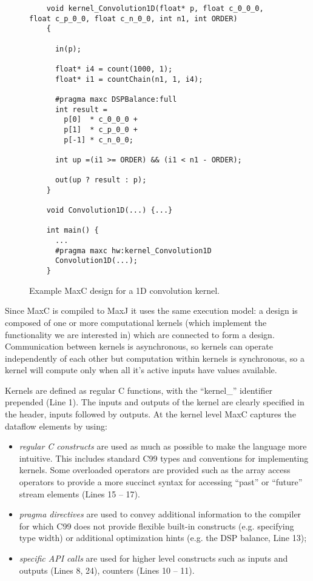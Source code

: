 \begin{figure}[!h]
  \begin{lstlisting}
    void kernel_Convolution1D(float* p, float c_0_0_0, float c_p_0_0, float c_n_0_0, int n1, int ORDER)
    {

      in(p);

      float* i4 = count(1000, 1);
      float* i1 = countChain(n1, 1, i4);

      #pragma maxc DSPBalance:full
      int result =
        p[0]  * c_0_0_0 +
        p[1]  * c_p_0_0 +
        p[-1] * c_n_0_0;

      int up =(i1 >= ORDER) && (i1 < n1 - ORDER);

      out(up ? result : p);
    }

    void Convolution1D(...) {...}

    int main() {
      ...
      #pragma maxc hw:kernel_Convolution1D
      Convolution1D(...);
    }
  \end{lstlisting}
  \caption{Example MaxC design for a 1D convolution kernel.}
  \label{fig:maxc-1dconv}
\end{figure}

Since MaxC is compiled to MaxJ it uses the same execution model: a
design is composed of one or more computational kernels (which
implement the functionality we are interested in) which are connected
to form a design. Communication between kernels is asynchronous, so
kernels can operate independently of each other but computation within
kernels is synchronous, so a kernel will compute only when all it's
active inputs have values available.

Kernels are defined as regular C functions, with the ``kernel\_''
identifier prepended (Line 1). The inputs and outputs of the kernel
are clearly specified in the header, inputs followed by outputs. At
the kernel level MaxC captures the dataflow elements by using:

\begin{itemize}
\item \emph{regular C constructs} are used as much as possible to make
  the language more intuitive. This includes standard C99 types and
  conventions for implementing kernels. Some overloaded operators are
  provided such as the array access operators to provide a more
  succinct syntax for accessing ``past'' or ``future'' stream elements
  (Lines 15 -- 17).

\item \emph{pragma directives} are used to convey additional
  information to the compiler for which C99 does not provide flexible
  built-in constructs (e.g. specifying type width) or additional
  optimization hints (e.g. the DSP balance, Line 13);

\item \emph{specific API calls} are used for higher level constructs
  such as inputs and outputs (Lines 8, 24), counters (Lines 10 -- 11).

\end{itemize}



